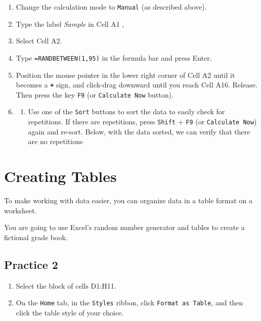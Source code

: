 \documentclass[
]{book}
\providecommand{\tightlist}{%
  \setlength{\itemsep}{0pt}\setlength{\parskip}{0pt}}
\begin{document}
\begin{enumerate}
\def\labelenumi{\arabic{enumi}.}
\item
  Change the calculation mode to \texttt{Manual} (as described above).
\item
  Type the label \emph{Sample} in Cell A1 ,
\item
  Select Cell A2.
\item
  Type \texttt{=RANDBETWEEN(1,95)} in the formula bar and press Enter.
\item
  Position the mouse pointer in the lower right corner of Cell A2 until it becomes a \textbf{\texttt{+}} sign, and click-drag downward until you reach Cell A16. Release. Then press the key \texttt{F9} (or \texttt{Calculate\ Now} button).
\item
  \begin{enumerate}
  \def\labelenumii{\arabic{enumii})}
  \setcounter{enumii}{5}
  \tightlist
  \item
    Use one of the \texttt{Sort} buttons to sort the data to easily check for repetitions. If there are repetitions, press \texttt{Shift} + \texttt{F9} (or \texttt{Calculate\ Now}) again and re-sort. Below, with the data sorted, we can verify that there are no repetitions
  \end{enumerate}
\end{enumerate}

\hypertarget{creating-tables}{%
\section{Creating Tables}\label{creating-tables}}

To make working with data easier, you can organize data in a table format on a worksheet.

You are going to use Excel's random number generator and tables to create a fictional grade book.

\hypertarget{practice-2-1}{%
\subsection{Practice 2}\label{practice-2-1}}

\begin{enumerate}
\def\labelenumi{\arabic{enumi}.}
\tightlist
\item
  Select the block of cells D1:H11.
\item
  On the \texttt{Home} tab, in the \texttt{Styles} ribbon, click \texttt{Format\ as\ Table}, and then click the table style of your choice.
\end{enumerate}
\end{document}
